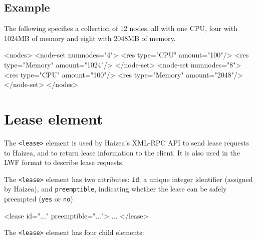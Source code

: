 \subsection{Example}

The following specifies a collection of 12 nodes, all with one CPU, four with 1024MB of memory and eight with 2048MB of memory.

\begin{wideshellverbatim} 
<nodes>
  <node-set numnodes="4">
    <res type="CPU" amount="100"/>
    <res type="Memory" amount="1024"/>
  </node-set>
  <node-set numnodes="8">
    <res type="CPU" amount="100"/>
    <res type="Memory" amount="2048"/>
  </node-set>
</nodes>
\end{wideshellverbatim}


\section{Lease element}

The \texttt{<lease>} element is used by Haizea's XML-RPC API to send lease requests to Haizea, and to return lease information to the client. It is also used in the LWF format to describe lease requests.

The \texttt{<lease>} element has two attributes: \texttt{id}, a unique integer identifier (assigned by Haizea), and \texttt{preemptible}, indicating whether the lease can be safely preempted (\texttt{yes} or \texttt{no})

\begin{wideshellverbatim} 
<lease id="..." preemptible="...">
  ...
</lease>
\end{wideshellverbatim}

The \texttt{<lease>} element has four child elements:

